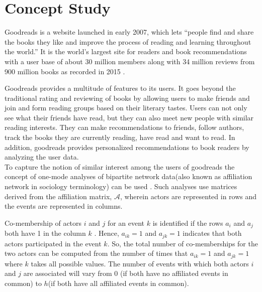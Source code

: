 \documentclass[11pt]{article}
\begin{document}
\maketitle
\newpage

\section{Concept Study}
Goodreads is a website launched in early 2007, which lets ``people find and share the books they like and improve the process of reading and learning throughout the world.'' It is the world's largest site for readers and book recommendations with a user base of about 30 million members along with 34 million reviews from 900 million books as recorded in 2015 \cite{goodreads:aboutus}.

Goodreads provides a multitude of features to its users. It goes beyond the traditional rating and reviewing of books by allowing users to make friends and join and form reading groups based on their literary tastes.
Users can not only see what their friends have read, but they can also meet new people with similar reading interests. They can make recommendations to friends, follow authors, track the books they are currently reading, have read and want to read. In addition, goodreads provides personalized recommendations to book readers by analyzing the user data. \\

To capture the notion of similar interest among the users of goodreads  the concept of one-mode analyses of bipartite network data(also known as affiliation network in sociology terminology) can be used \cite{wasserman}. Such analyses use matrices derived from the affiliation matrix, $\mathcal{A}$, wherein actors are represented in rows and the events are represented in columns.

Co-membership of actors $i$ and $j$ for an event $k$ is identified if the rows $a_i$ and $a_j$ both have 1 in the column $k$ .
Hence,  $a_{ik} = 1$ and $a_{jk} = 1$ indicates that both actors participated in the event $k$. So, the total number of co-memberships for the two actors can be computed from the number of times that $a_{ik} = 1$ and $a_{jk} = 1$ where $k$ takes all possible values. The number of events with which both actors $i$ and $j$ are associated will vary from 0 (if both have no affiliated events in common) to $h$(if both have all affiliated events in common).\\
\end{document}
